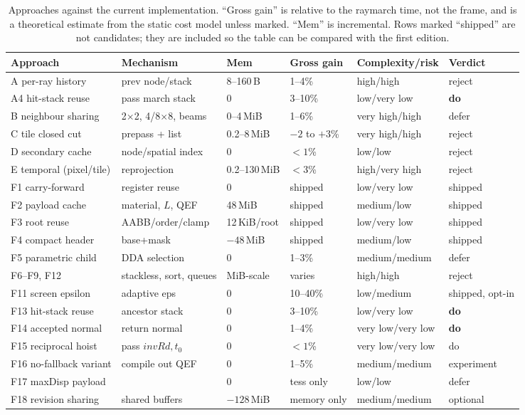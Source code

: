 \documentclass[11pt,a4paper]{article}
\newcommand{\code}[1]{\texttt{\detokenize{#1}}}
\newcommand{\Lips}{L}
\theoremstyle{plain}
\theoremstyle{definition}
\theoremstyle{remark}
\begin{document}
\begin{table}[t]
\centering
\scriptsize
\setlength{\tabcolsep}{3pt}
\caption{Approaches against the current implementation. ``Gross gain'' is
relative to the raymarch time, not the frame, and is a theoretical estimate
from the static cost model unless marked. ``Mem'' is incremental. Rows marked
``shipped'' are not candidates; they are included so the table can be compared
with the first edition.}
\label{tab:approaches}
\begin{tabularx}{\linewidth}{@{}p{3.3cm}p{3.2cm}p{1.6cm}p{1.5cm}p{2.2cm}p{2.2cm}@{}}
\toprule
Approach & Mechanism & Mem & Gross gain & Complexity/risk & Verdict \\
\midrule
A per-ray history & prev node/stack & 8--160\,B & 1--4\% & high/high & reject \\
A4 hit-stack reuse & pass march stack & 0 & 3--10\% & low/very low & \textbf{do} \\
B neighbour sharing & 2$\times$2, 4/8$\times$8, beams & 0--4\,MiB & 1--6\% & very high/high & defer \\
C tile closed cut & prepass + list & 0.2--8\,MiB & $-2$ to $+3$\% & very high/high & reject \\
D secondary cache & node/spatial index & 0 & $<1$\% & low/low & reject \\
E temporal (pixel/tile) & reprojection & 0.2--130\,MiB & $<3$\% & high/very high & reject \\
F1 carry-forward & register reuse & 0 & shipped & low/very low & shipped \\
F2 payload cache & material, $\Lips$, QEF & 48\,MiB & shipped & medium/low & shipped \\
F3 root reuse & AABB/order/clamp & 12\,KiB/root & shipped & low/very low & shipped \\
F4 compact header & base+mask & $-48$\,MiB & shipped & medium/low & shipped \\
F5 parametric child & DDA selection & 0 & 1--3\% & medium/medium & defer \\
F6--F9, F12 & stackless, sort, queues & MiB-scale & varies & high/high & reject \\
F11 screen epsilon & adaptive eps & 0 & 10--40\% & low/medium & shipped, opt-in \\
F13 hit-stack reuse & ancestor stack & 0 & 3--10\% & low/very low & \textbf{do} \\
F14 accepted normal & return normal & 0 & 1--4\% & very low/very low & \textbf{do} \\
F15 reciprocal hoist & pass $invRd,t_0$ & 0 & $<1$\% & very low/very low & do \\
F16 no-fallback variant & compile out QEF & 0 & 1--5\% & medium/medium & experiment \\
F17 maxDisp payload & \code{normal.w} & 0 & tess only & low/low & defer \\
F18 revision sharing & shared buffers & $-128$\,MiB & memory only & medium/medium & optional \\
\bottomrule
\end{tabularx}
\end{table}
\end{document}
